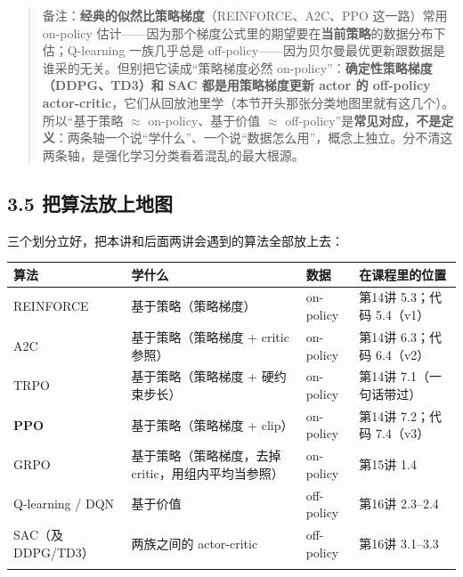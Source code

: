 \documentclass[
  chinese,
]{ctexart}
\begin{document}
\begin{quote}
备注：\textbf{经典的似然比策略梯度}（REINFORCE、A2C、PPO 这一路）常用
on-policy
估计------因为那个梯度公式里的期望要在\textbf{当前策略}的数据分布下估；Q-learning
一族几乎总是
off-policy------因为贝尔曼最优更新跟数据是谁采的无关。但别把它读成``策略梯度必然
on-policy''：\textbf{确定性策略梯度（DDPG、TD3）和 SAC
都是用策略梯度更新 actor 的 off-policy
actor-critic}，它们从回放池里学（本节开头那张分类地图里就有这几个）。所以``基于策略
\(\approx\) on-policy、基于价值 \(\approx\)
off-policy''是\textbf{常见对应，不是定义}：两条轴一个说``学什么''、一个说``数据怎么用''，概念上独立。分不清这两条轴，是强化学习分类看着混乱的最大根源。
\end{quote}

\subsection{3.5
把算法放上地图}\label{ux628aux7b97ux6cd5ux653eux4e0aux5730ux56fe}

三个划分立好，把本讲和后面两讲会遇到的算法全部放上去：

\begin{center}
\begin{tabular}{@{}>{\raggedright\arraybackslash}p{} >{\raggedright\arraybackslash}p{} >{\raggedright\arraybackslash}p{} >{\raggedright\arraybackslash}p{}@{}}
\toprule\noalign{}
算法 & 学什么 & 数据 & 在课程里的位置 \\
\midrule\noalign{}
REINFORCE & 基于策略（策略梯度） & on-policy & 第14讲 5.3；代码 5.4（v1） \\
A2C & 基于策略（策略梯度 + critic 参照） & on-policy & 第14讲 6.3；代码 6.4（v2） \\
TRPO & 基于策略（策略梯度 + 硬约束步长） & on-policy & 第14讲 7.1（一句话带过） \\
\textbf{PPO} & 基于策略（策略梯度 + clip） & on-policy & 第14讲 7.2；代码 7.4（v3） \\
GRPO & 基于策略（策略梯度，去掉 critic，用组内平均当参照） & on-policy & 第15讲 1.4 \\
Q-learning / DQN & 基于价值 & off-policy & 第16讲 2.3--2.4 \\
SAC（及 DDPG/TD3） & 两族之间的 actor-critic & off-policy & 第16讲 3.1--3.3 \\
\bottomrule\noalign{}
\end{tabular}
\end{center}
\end{document}
